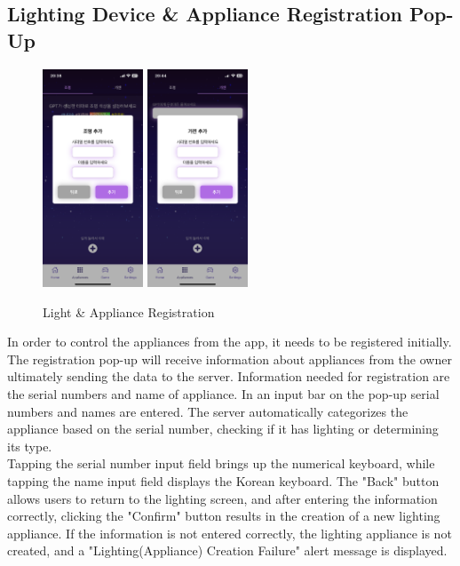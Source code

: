 \documentclass[conference]{IEEEtran}
\begin{document}
    \subsection{Lighting Device \& Appliance Registration Pop-Up}
        \begin{figure}[htbp]
            \centerline{\includegraphics[width=3cm]{Images/screen/light/2_LIGHT_ADD_EMPTY.PNG}
            \includegraphics[width=3cm]{Images/screen/elec/2_ELEC_ADD_EMPTY.PNG}}
            \caption{Light \& Appliance Registration}
            \label{fig}
        \end{figure}
        In order to control the appliances from the app, it needs to be registered initially. The registration pop-up will receive information about appliances from the owner ultimately sending the data to the server. Information needed for registration are the serial numbers and name of appliance. In an input bar on the pop-up serial numbers and names are entered. The server automatically categorizes the appliance based on the serial number, checking if it has lighting or determining its type.\\
        Tapping the serial number input field brings up the numerical keyboard, while tapping the name input field displays the Korean keyboard. The "Back" button allows users to return to the lighting screen, and after entering the information correctly, clicking the "Confirm" button results in the creation of a new lighting appliance. If the information is not entered correctly, the lighting appliance is not created, and a "Lighting(Appliance) Creation Failure" alert message is displayed.
\end{document}
